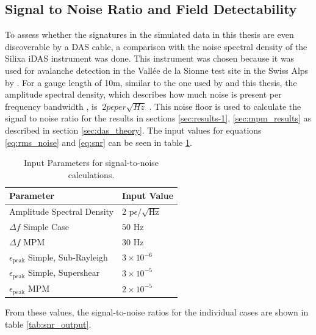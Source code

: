 \subsection{Signal to Noise Ratio and Field Detectability}
\label{sec:DAS_noise}
To assess whether the signatures in the simulated data in this thesis are even discoverable by a DAS cable, a comparison with the noise spectral density of the Silixa iDAS instrument \parencite{parkerDistributedAcousticSensing2014, idasdatasheet} was done.  This instrument was chosen because it was used for avalanche detection in the Vallée de la Sionne test site in the Swiss Alps by \cite{paitzPhenomenologyAvalancheRecordings2023, edmeFiberopticDetectionSnow2023}. For a gauge length of 10m, similar to the one used by \cite{turquetAutomatedSnowAvalanche2024} and this thesis, the amplitude spectral density, which describes how much noise is present per frequency bandwidth \parencite{hartogIntroductionDistributedOptical2017}, is $\ 2 p\epsilon per \sqrt{Hz}$ \parencite{idasdatasheet}. This noise floor is used to calculate the signal to noise ratio for the results in sections \ref{sec:results-1}, \ref{sec:mpm_results} as described in section \ref{sec:das_theory}. The input values for equations \ref{eq:rms_noise} and \ref{eq:snr} can be seen in table \ref{tab:snr_input}. 
\begin{table}[H]
\centering
\begin{tabular}{|l|l|}
\hline
\textbf{Parameter} & \textbf{Input Value} \\ \hline
Amplitude Spectral Density & $2\text{ p}\epsilon/\sqrt{\text{Hz}}$ \\ \hline
$\Delta f$ Simple Case & $50\text{ Hz}$ \\ \hline
$\Delta f$ MPM & $30\text{ Hz}$ \\ \hline
$\epsilon_{\text{peak}}$ Simple, Sub-Rayleigh & $3 \times 10^{-6}$ \\ \hline
$\epsilon_{\text{peak}}$ Simple, Supershear & $3 \times 10^{-5}$ \\ \hline
$\epsilon_{\text{peak}}$ MPM & $2 \times 10^{-5}$ \\ \hline
\end{tabular}
\caption{Input Parameters for signal-to-noise calculations.}
\label{tab:snr_input}
\end{table}

From these values, the signal-to-noise ratios for the individual cases are shown in table \ref{tab:snr_output}. 

